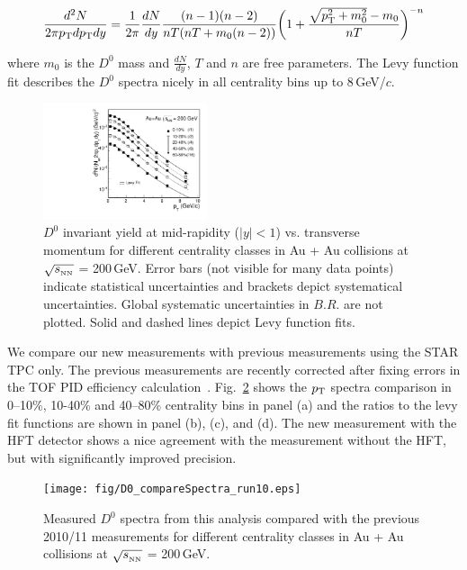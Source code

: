 \documentclass[%
 reprint,	
 amsmath,amssymb,
 aps,
 prc,
]{revtex4-1}
\begin{document}
\begin{widetext}
\[
\frac{d^2N}{2\pi p_{\rm T}dp_{\rm T}dy} = \frac{1}{2\pi}\frac{dN}{dy}\frac{(n-1)(n-2)}{nT(nT+m_0(n-2))}\bigg(1+\frac{\sqrt{p_{\rm T}^2+m_0^2}-m_0}{nT}\bigg)^{-n}
\]
\end{widetext}

where $m_0$ is the $D^0$ mass and $\frac{dN}{dy}$, $T$ and $n$ are free parameters. The Levy function fit describes the $D^0$ spectra nicely in all centrality bins up to 8\,GeV/$c$.

\begin{figure}
\centering
\includegraphics[width=0.43\textwidth]{fig/D0_spectra.pdf}
\caption{$D^{0}$ invariant yield at mid-rapidity ($|y|<1$) vs. transverse momentum for different centrality classes in Au + Au collisions at $\sqrt{s_{_{\rm NN}}}$ = 200\,GeV. Error bars (not visible for many data points) indicate statistical uncertainties and brackets depict systematical uncertainties. Global systematic uncertainties in $B.R.$ are not plotted. Solid and dashed lines depict Levy function fits.}
\label{fig:D0_spectra} 
\end{figure}

We compare our new measurements with previous measurements using the STAR TPC only. The previous measurements are recently corrected after fixing errors in the TOF PID efficiency calculation~\cite{Star_D_RAA,Star_D_RAA_corr}. Fig.~\ref{fig:D0_compareSpectra_run10} shows the $p_{\rm T}$ spectra comparison in 0--10\%, 10-40\% and 40--80\% centrality bins in panel (a) and the ratios to the levy fit functions are shown in panel (b), (c), and (d). The new measurement with the HFT detector shows a nice agreement with the measurement without the HFT, but with significantly improved precision.

\begin{figure}
\centering
\texttt{[image: fig/D0\_compareSpectra\_run10.eps]}
\caption{Measured $D^{0}$ spectra from this analysis compared with the previous 2010/11 measurements for different centrality classes in Au + Au collisions at $\sqrt{s_{_{\rm NN}}}$ = 200\,GeV.}
\label{fig:D0_compareSpectra_run10} 
\end{figure}
\end{document}
